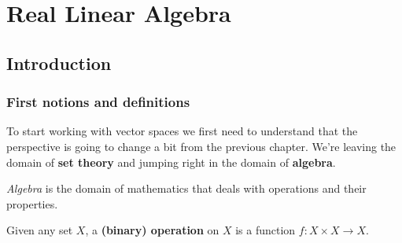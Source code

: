 \chapter{Real Linear Algebra}
\section{Introduction}
\subsection{First notions and definitions}

To start working with vector spaces we first need to understand that the perspective is going to change a bit from the previous chapter. We're leaving the domain of \textbf{set theory} and jumping right in the domain of \textbf{algebra}.

\textit{Algebra }is the domain of mathematics that deals with operations and their properties.

\begin{df}
	Given any set $X$, a \textbf{(binary) operation} on $X$ is a function $f:X\times X \to X$.
\end{df}

